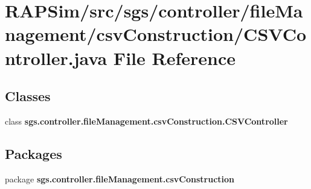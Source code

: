 \section{R\-A\-P\-Sim/src/sgs/controller/file\-Management/csv\-Construction/\-C\-S\-V\-Controller.java File Reference}
\label{_c_s_v_controller_8java}
\subsection*{Classes}
\begin{DoxyCompactItemize}
\item 
class {\bf sgs.\-controller.\-file\-Management.\-csv\-Construction.\-C\-S\-V\-Controller}
\end{DoxyCompactItemize}
\subsection*{Packages}
\begin{DoxyCompactItemize}
\item 
package {\bf sgs.\-controller.\-file\-Management.\-csv\-Construction}
\end{DoxyCompactItemize}
